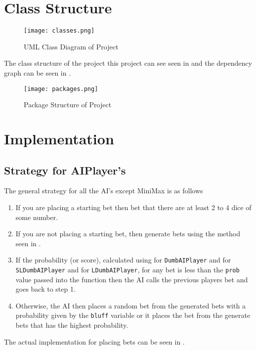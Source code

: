 \section{Class Structure}

\begin{figure}
    \centering
    \texttt{[image: classes.png]}
    \caption{UML Class Diagram of Project}
    \label{fig:class}
\end{figure}

The class structure of the project this project can see seen in  and the dependency graph can be seen in .

\begin{figure}
    \centering
    \texttt{[image: packages.png]}
    \caption{Package Structure of Project}
    \label{fig:package}
\end{figure}

\section{Implementation}
\subsection{Strategy for AIPlayer's}

The general strategy for all the AI's except MiniMax is as follows
\begin{enumerate}
    \item If you are placing a starting bet then bet that there are at least 2 to 4 dice of some number.
    \item If you are not placing a starting bet, then generate bets using the method seen in .
    \item If the probability (or score), calculated using  for \texttt{DumbAIPlayer} and  for \texttt{SLDumbAIPlayer} and  for \texttt{LDumbAIPlayer}, for any bet is less than the \texttt{prob} value passed into the function then the AI calls the previous players bet and goes back to step 1.
    \item Otherwise, the AI then places a random bet from the generated bets with a probability given by the \texttt{bluff} variable or it places the bet from the generate bets that has the highest probability.
\end{enumerate}
The actual implementation for placing bets can be seen in .

